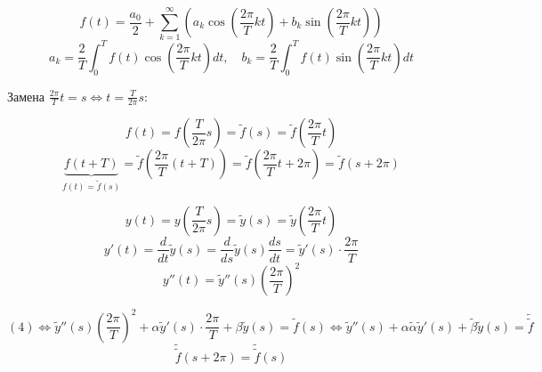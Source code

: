 \documentclass[12pt, a4paper]{report}
\begin{document}
\[ f(t ) = \frac{a_0}{2 }  + \sum_{k =1}^{\infty  }\left( a_k \cos \left( \frac{2 \pi}{T } kt   \right) + b_k \sin  \left( \frac{ 2\pi }{T } kt   \right) \right)   \]  
\[ a_k = \frac{2}{T }  \int_{0}^{T } f(t ) \cos \left( \frac{2\pi }{T } kt   \right)dt , \quad  b_k = \frac{2}{T }  \int_{0 }^{T }  f(t )\sin \left( \frac{2 \pi }{T }kt   \right)  dt \] 

Замена \( \displaystyle  \frac{ 2 \pi }{T } t = s \Leftrightarrow  t = \frac{T}{2 \pi } s :   \) 

\[ f(t ) = f\left( \frac{T}{2 \pi }s   \right)   = \tilde{f } (s ) = \tilde{f }\left( \frac{2\pi }{T }t  \right)\]  
\[ \underbrace{f(t +T )}_{f(t )=\tilde{f }(s)} =\tilde{ f } \left( \frac{ 2\pi }{T} (t +T ) \right) = \tilde{ f } \left( \frac{2\pi }{T } t + 2 \pi   \right)  = \tilde{ f } (s + 2 \pi)\]  

\[ y(t )= y \left( \frac{T}{2 \pi } s   \right)  = \tilde{ y }(s ) = \tilde{y }\left( \frac{2\pi}{T}t  \right)\]  
\[ y '(t ) = \frac{d}{dt  }  \tilde{y }(s ) = \frac{d}{ds }  \tilde{ y }(s ) \frac{ds}{dt } = \tilde{y }' (s ) \cdot \frac{2\pi}{T} \]  
\[ y''(t ) = \tilde{y }'' (s ) \left( \frac{2\pi}{T}  \right) ^2 \]  

\[ (4 ) \Leftrightarrow  \tilde{y }'' ( s )\left(  \frac{2\pi}{T }  \right) ^2 + \alpha \tilde{ y }' (s  ) \cdot \frac{2\pi}{T} + \beta \tilde{y }(s ) = \tilde{f}(s ) \Leftrightarrow  \tilde{ y }'' (s ) + \alpha \tilde{ \alpha }\tilde{y }' (s )+ \tilde{\beta} \tilde{y }(s ) = \tilde{\tilde{f }} \] 
\[ \tilde{\tilde{f }}(s+ 2 \pi) = \tilde{\tilde{f }}(s) \] 



\ifdefined\mainfile
\else
    
\end{document}
